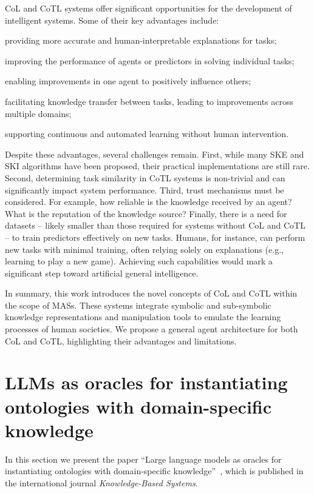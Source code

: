 \gls{CoL} and \gls{CoTL} systems offer significant opportunities for the development of intelligent systems.
%
Some of their key advantages include:
%
\begin{inlinelist}
    \item providing more accurate and human-interpretable explanations for tasks;
    \item improving the performance of agents or predictors in solving individual tasks;
    \item enabling improvements in one agent to positively influence others;
    \item facilitating knowledge transfer between tasks, leading to improvements across multiple domains;
    \item supporting continuous and automated learning without human intervention.
\end{inlinelist}
%

Despite these advantages, several challenges remain.
%
First, while many \gls{SKE} and \gls{SKI} algorithms have been proposed, their practical implementations are still rare.
%
Second, determining task similarity in \gls{CoTL} systems is non-trivial and can significantly impact system performance.
%
Third, trust mechanisms must be considered.
%
For example, how reliable is the knowledge received by an agent?
%
What is the reputation of the knowledge source?
%
Finally, there is a need for datasets -- likely smaller than those required for systems without \gls{CoL} and \gls{CoTL} -- to train predictors effectively on new tasks.
%
Humans, for instance, can perform new tasks with minimal training, often relying solely on explanations (e.g., learning to play a new game).
%
Achieving such capabilities would mark a significant step toward artificial general intelligence.
%

In summary, this work introduces the novel concepts of \gls{CoL} and \gls{CoTL} within the scope of \glspl{MAS}.
%
These systems integrate symbolic and sub-symbolic knowledge representations and manipulation tools to emulate the learning processes of human societies.
%
We propose a general agent architecture for both \gls{CoL} and \gls{CoTL}, highlighting their advantages and limitations.
%





\section{\Glspl{LLM} as oracles for instantiating ontologies with domain-specific knowledge}
\label{sec:llm-as-oracles-for-instantiating-ontologies-with-domain-specific-knowledge}
%
In this section we present the paper ``Large language models as oracles for instantiating ontologies with domain-specific knowledge''~\cite{DBLP:journals/kbs/CiattoAMO25}, which is published in the international journal \emph{Knowledge-Based Systems}.

